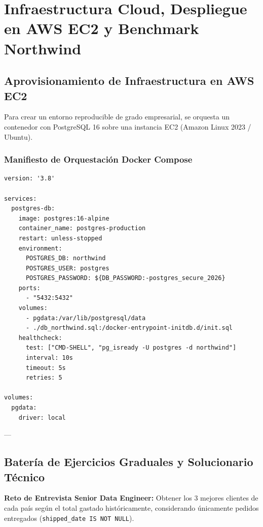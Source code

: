 \chapter{Infraestructura Cloud, Despliegue en AWS EC2 y Benchmark Northwind}
\label{chap:lab01_postgre_northwind_aws}

\section{Aprovisionamiento de Infraestructura en AWS EC2}

Para crear un entorno reproducible de grado empresarial, se orquesta un contenedor con PostgreSQL 16 sobre una instancia EC2 (Amazon Linux 2023 / Ubuntu).

\subsection{Manifiesto de Orquestaci\'on Docker Compose}

\begin{lstlisting}[style=bashstyle, caption={Manifiesto docker-compose.yml de producci\'on}]
version: '3.8'

services:
  postgres-db:
    image: postgres:16-alpine
    container_name: postgres-production
    restart: unless-stopped
    environment:
      POSTGRES_DB: northwind
      POSTGRES_USER: postgres
      POSTGRES_PASSWORD: ${DB_PASSWORD:-postgres_secure_2026}
    ports:
      - "5432:5432"
    volumes:
      - pgdata:/var/lib/postgresql/data
      - ./db_northwind.sql:/docker-entrypoint-initdb.d/init.sql
    healthcheck:
      test: ["CMD-SHELL", "pg_isready -U postgres -d northwind"]
      interval: 10s
      timeout: 5s
      retries: 5

volumes:
  pgdata:
    driver: local
\end{lstlisting}

---

\section{Bater\'ia de Ejercicios Graduales y Solucionario T\'ecnico}

\begin{businessproblem}
\textbf{Reto de Entrevista Senior Data Engineer:} Obtener los 3 mejores clientes de cada pa\'is seg\'un el total gastado hist\'oricamente, considerando \'unicamente pedidos entregados (\texttt{shipped\_date IS NOT NULL}).
\end{businessproblem}


